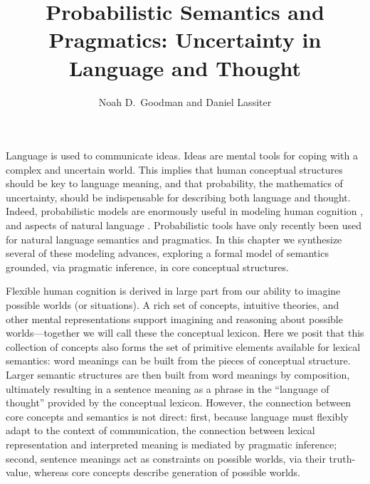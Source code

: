 \documentclass[pdfextras]{handbook}
\begin{document}
\linenumbers

\title*{Probabilistic Semantics and Pragmatics: Uncertainty in Language and Thought}


\author{Noah D.~Goodman
        and Daniel Lassiter}



\maketitle




\tableofcontents
\pagebreak
\listoftodos
\pagebreak




Language is used to communicate ideas. Ideas are mental tools for coping with a complex and uncertain world. This implies that human conceptual structures should be key to language meaning, and that probability, the mathematics of uncertainty, should be indispensable for describing both language and thought. Indeed, probabilistic models are enormously useful in modeling human cognition \cite{Tenenbaum, etc}, and aspects of natural language \cite{bodetal03,ChaterManning}. Probabilistic tools have only recently been used for natural language semantics and pragmatics. In this chapter we synthesize several of these modeling advances, exploring a formal model of semantics grounded, via pragmatic inference, in core conceptual structures.

Flexible human cognition is derived in large part from our ability to imagine possible worlds (or situations). 
A rich set of concepts, intuitive theories, and other mental representations support imagining and reasoning about possible worlds---together we will call these the conceptual lexicon. 
Here we posit that this collection of concepts also forms the set of primitive elements available for lexical semantics: word meanings can be built from the pieces of conceptual structure. Larger semantic structures are then built from word meanings by composition, ultimately resulting in a sentence meaning as a phrase in the ``language of thought'' provided by the conceptual lexicon.
However, the connection between core concepts and semantics is not direct: 
first, because language must flexibly adapt to the context of communication, the connection between lexical representation and interpreted meaning is mediated by pragmatic inference;
second, sentence meanings act as constraints on possible worlds, via their truth-value, whereas core concepts describe generation of possible worlds.
\end{document}
